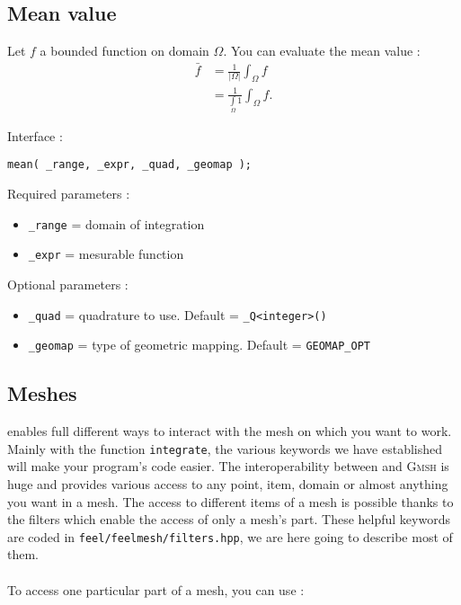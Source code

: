 \subsection{Mean value}
Let $f$ a bounded function on domain $\Omega$. You can evaluate the mean value :
\begin{align*}
 \bar{f}&=\frac{1}{|\Omega|}\int_\Omega f\\
&=\frac{1}{\int\limits_\Omega 1}\int_\Omega f.
\end{align*}

\label{keywords:mean}
\noindent Interface :
\begin{lstlisting}
mean( _range, _expr, _quad, _geomap );
\end{lstlisting}

\noindent Required parameters :
\begin{itemize}
 \item \lstinline!_range! = domain of integration
 \item \lstinline!_expr! = mesurable function
\end{itemize}

\noindent Optional parameters :
\begin{itemize}
 \item \lstinline!_quad! = quadrature to use. Default = \lstinline!_Q<integer>()!
 \item \lstinline!_geomap! = type of geometric mapping. Default = \lstinline!GEOMAP_OPT!
\end{itemize}

\subsection{Meshes}
\label{keywords:meshes}

\feel enables full different ways to interact with the mesh on which you want to work. Mainly with the function \lstinline!integrate!, the various keywords we have established will make your program's code easier. The interoperability between \feel and \textsc{Gmsh} is huge and provides various access to any point, item, domain or almost anything you want in a mesh.
The access to different items of a mesh is possible thanks to the filters which enable the access of only a mesh's part. These helpful keywords are coded in \lstinline!feel/feelmesh/filters.hpp!, we are here going to describe most of them. \\ \\ To access one particular part of a mesh, you can use :

